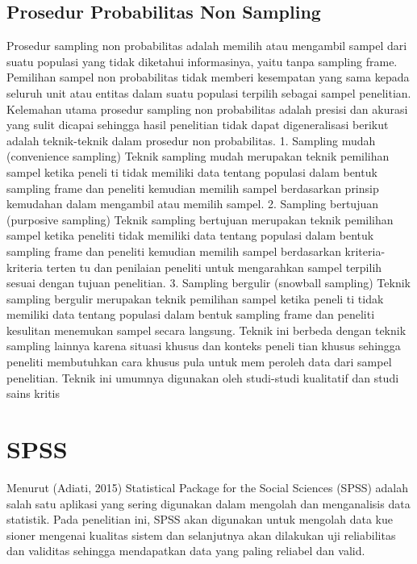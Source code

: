 \subsection{Prosedur Probabilitas Non Sampling}
Prosedur sampling non probabilitas adalah memilih atau mengambil sampel dari suatu populasi yang tidak diketahui informasinya, yaitu tanpa sampling frame. Pemilihan sampel non probabilitas tidak memberi kesempatan yang sama kepada seluruh unit atau entitas dalam suatu populasi terpilih sebagai sampel penelitian. Kelemahan utama prosedur sampling non probabilitas adalah presisi dan akurasi yang sulit dicapai sehingga hasil penelitian tidak dapat digeneralisasi berikut adalah teknik-teknik dalam prosedur non probabilitas. 1. Sampling mudah (convenience sampling) Teknik sampling mudah merupakan teknik pemilihan sampel ketika peneli ti tidak memiliki data tentang populasi dalam bentuk sampling frame dan peneliti kemudian memilih sampel berdasarkan prinsip kemudahan dalam mengambil atau memilih sampel. 2. Sampling bertujuan (purposive sampling) Teknik sampling bertujuan merupakan teknik pemilihan sampel ketika peneliti tidak memiliki data tentang populasi dalam bentuk sampling frame dan peneliti kemudian memilih sampel berdasarkan kriteria-kriteria terten tu dan penilaian peneliti untuk mengarahkan sampel terpilih sesuai dengan tujuan penelitian. 3. Sampling bergulir (snowball sampling) Teknik sampling bergulir merupakan teknik pemilihan sampel ketika peneli ti tidak memiliki data tentang populasi dalam bentuk sampling frame dan peneliti kesulitan menemukan sampel secara langsung. Teknik ini berbeda dengan teknik sampling lainnya karena situasi khusus dan konteks peneli tian khusus sehingga peneliti membutuhkan cara khusus pula untuk mem peroleh data dari sampel penelitian. Teknik ini umumnya digunakan oleh studi-studi kualitatif dan studi sains kritis
\section{SPSS}
Menurut (Adiati, 2015) Statistical Package for the Social Sciences (SPSS)
adalah salah satu aplikasi yang sering digunakan dalam mengolah dan menganalisis
data statistik. Pada penelitian ini, SPSS akan digunakan untuk mengolah data kue
sioner mengenai kualitas sistem dan selanjutnya akan dilakukan uji reliabilitas dan
validitas sehingga mendapatkan data yang paling reliabel dan valid.
